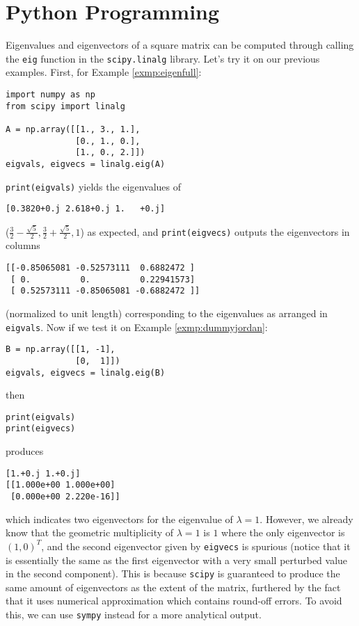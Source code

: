 \section{Python Programming}
Eigenvalues and eigenvectors of a square matrix can be computed through calling the \verb|eig| function in the \texttt{scipy.linalg} library. Let's try it on our previous examples. First, for Example \ref{exmp:eigenfull}:
\begin{lstlisting}
import numpy as np
from scipy import linalg

A = np.array([[1., 3., 1.],
              [0., 1., 0.],
              [1., 0., 2.]])
eigvals, eigvecs = linalg.eig(A)
\end{lstlisting}
\verb|print(eigvals)| yields the eigenvalues of 
\begin{lstlisting}
[0.3820+0.j 2.618+0.j 1.   +0.j]    
\end{lstlisting}
($\frac{3}{2}-\frac{\sqrt{5}}{2}, \frac{3}{2}+\frac{\sqrt{5}}{2}, 1$) as expected, and \verb|print(eigvecs)| outputs the eigenvectors in columns
\begin{lstlisting}
[[-0.85065081 -0.52573111  0.6882472 ]
 [ 0.          0.          0.22941573]
 [ 0.52573111 -0.85065081 -0.6882472 ]]
\end{lstlisting}
(normalized to unit length) corresponding to the eigenvalues as arranged in \verb|eigvals|. Now if we test it on Example \ref{exmp:dummyjordan}:
\begin{lstlisting}
B = np.array([[1, -1],
              [0,  1]])
eigvals, eigvecs = linalg.eig(B)
\end{lstlisting}
then
\begin{lstlisting}
print(eigvals)
print(eigvecs)
\end{lstlisting}
produces
\begin{lstlisting}
[1.+0.j 1.+0.j]
[[1.000e+00 1.000e+00]
 [0.000e+00 2.220e-16]]
\end{lstlisting}
which indicates two eigenvectors for the eigenvalue of $\lambda = 1$. However, we already know that the geometric multiplicity of $\lambda = 1$ is $1$ where the only eigenvector is $(1,0)^T$, and the second eigenvector given by \verb|eigvecs| is spurious (notice that it is essentially the same as the first eigenvector with a very small perturbed value in the second component). This is because \texttt{scipy} is guaranteed to produce the same amount of eigenvectors as the extent of the matrix, furthered by the fact that it uses numerical approximation which contains round-off errors. To avoid this, we can use \texttt{sympy} instead for a more analytical output.
